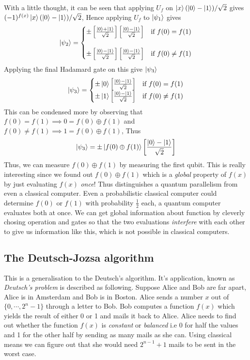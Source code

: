 With a little thought, it can be seen that applying $U_f$ on $\ket{x}(\ket{0}-\ket{1})/\sqrt{2}$ gives $(-1)^{f(x)}\ket{x}(\ket{0}-\ket{1})/\sqrt{2}$, Hence applying $U_f$ to $\ket{\psi_1}$ gives
\begin{equation}
    \ket{\psi_2} = \begin{cases}
        \pm\left[
            \frac{\ket{0}+\ket{1}}{\sqrt{2}}
        \right]
        \left[
                \frac{\ket{0}-\ket{1}}{\sqrt{2}}
        \right] &\text{if } f(0) = f(1) \\\\
        \pm\left[
            \frac{\ket{0}-\ket{1}}{\sqrt{2}}
        \right]
        \left[
            \frac{\ket{0}-\ket{1}}{\sqrt{2}}
        \right]&\text{if } f(0) \neq f(1)
    \end{cases}
\end{equation}
Applying the final Hadamard gate on this give $\ket{\psi_3}$
\begin{equation}
    \ket{\psi_3} = \begin{cases}
        \pm \ket{0} \left[ \frac{\ket{0}-\ket{1}}{\sqrt{2}} \right]
        &\text{if } f(0) = f(1)\\
        \pm \ket{1} \left[ \frac{\ket{0}-\ket{1}}{\sqrt{2}} \right]
        &\text{if } f(0) \neq f(1)
    \end{cases}
\end{equation}
This can be condensed more by observing that $f(0)=f(1) \implies 0 = f(0)\oplus f(1)$ and $f(0) \neq f(1) \implies 1 = f(0)\oplus f(1)$, Thus
\begin{equation}
    \ket{\psi_3} = \pm \ket{f(0) \oplus f(1)} \left[ \frac{\ket{0}-\ket{1}}{\sqrt{2}} \right]
\end{equation}
Thus, we can measure $f(0)\oplus f(1)$ by measuring the first qubit. This is really interesting since we found out $f(0)\oplus f(1)$ which is a \textit{global} property of $f(x)$ by just evaluating $f(x)$ \textit{once}! Thus distinguishes a quantum parallelism from even a classical computer. Even a probabilistic classical computer could determine $f(0)$ or $f(1)$ with probability $\frac{1}{2}$ each, a quantum computer evaluates both at once. We can get global information about function by cleverly chosing operation and gates so that the two evaluations \textit{interfere} with each other to give us information like this, which is not possible in classical computers.

\subsection{The Deutsch-Jozsa algorithm}
This is a generalisation to the Deutsch's algorithm. It's application, known as \textit{Deutsch's problem} is described as following. Suppose Alice and Bob are far apart, Alice is in Amsterdam and Bob is in Boston. Alice sends a number $x$ out of $\{ 0,\cdots,2^n-1 \}$ through a letter to Bob. Bob computes a function $f(x)$ which yields the result of either 0 or 1 and mails it back to Alice. Alice needs to find out whether the function $f(x)$ is \textit{constant} or \textit{balanced} i.e 0 for half the values and 1 for the other half by sending as many mails as she can. Using classical means we can figure out that she would need $2^{n-1}+1$ mails to be sent in the worst case.

